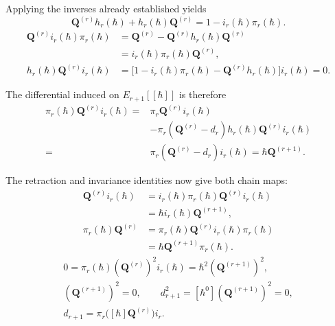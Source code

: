 \documentclass[11pt]{article}
\numberwithin{equation}{section}
\numberwithin{figure}{section}
\numberwithin{table}{section}
\begin{document}
\begin{proofbox}
Applying the inverses already established yields
\begin{equation}\label{eq-ch8-transfer-homotopy-proved}
\mathbf Q^{(r)}h_r(\hbar)+h_r(\hbar)\mathbf Q^{(r)}
=1-i_r(\hbar)\pi_r(\hbar).
\end{equation}
\begin{equation}\label{eq-ch8-transfer-invariance}
\begin{aligned}
\mathbf Q^{(r)}i_r(\hbar)\pi_r(\hbar)
&=\mathbf Q^{(r)}-\mathbf Q^{(r)}h_r(\hbar)\mathbf Q^{(r)}\\
&=i_r(\hbar)\pi_r(\hbar)\mathbf Q^{(r)},\\
h_r(\hbar)\mathbf Q^{(r)}i_r(\hbar)
&=\bigl[1-i_r(\hbar)\pi_r(\hbar)
-\mathbf Q^{(r)}h_r(\hbar)\bigr]i_r(\hbar)=0.
\end{aligned}
\end{equation}

The differential induced on $E_{r+1}[[\hbar]]$ is therefore
\begin{equation}\label{eq-ch8-transfer-induced-differential}
\begin{aligned}
\pi_r(\hbar)\mathbf Q^{(r)}i_r(\hbar)
={}&\pi_r\mathbf Q^{(r)}i_r(\hbar)\\
&-\pi_r(\mathbf Q^{(r)}-d_r)h_r(\hbar)
\mathbf Q^{(r)}i_r(\hbar)\\
={}&\pi_r(\mathbf Q^{(r)}-d_r)i_r(\hbar)
=\hbar\mathbf Q^{(r+1)}.
\end{aligned}
\end{equation}

The retraction and invariance identities now give both chain maps:
\begin{equation}\label{eq-ch8-transfer-chain-maps-proved}
\begin{aligned}
\mathbf Q^{(r)}i_r(\hbar)
&=i_r(\hbar)\pi_r(\hbar)\mathbf Q^{(r)}i_r(\hbar)\\
&=\hbar i_r(\hbar)\mathbf Q^{(r+1)},\\
\pi_r(\hbar)\mathbf Q^{(r)}
&=\pi_r(\hbar)\mathbf Q^{(r)}i_r(\hbar)\pi_r(\hbar)\\
&=\hbar\mathbf Q^{(r+1)}\pi_r(\hbar).
\end{aligned}
\end{equation}
\begin{equation}\label{eq-ch8-transfer-nilpotence-proved}
\begin{gathered}
0=\pi_r(\hbar)(\mathbf Q^{(r)})^2i_r(\hbar)
=\hbar^2(\mathbf Q^{(r+1)})^2,\\
(\mathbf Q^{(r+1)})^2=0,\qquad
d_{r+1}^2=[\hbar^0](\mathbf Q^{(r+1)})^2=0,\\
d_{r+1}=\pi_r\bigl([\hbar]\mathbf Q^{(r)}\bigr)i_r.
\end{gathered}
\end{equation}


\end{proofbox}
\end{document}
